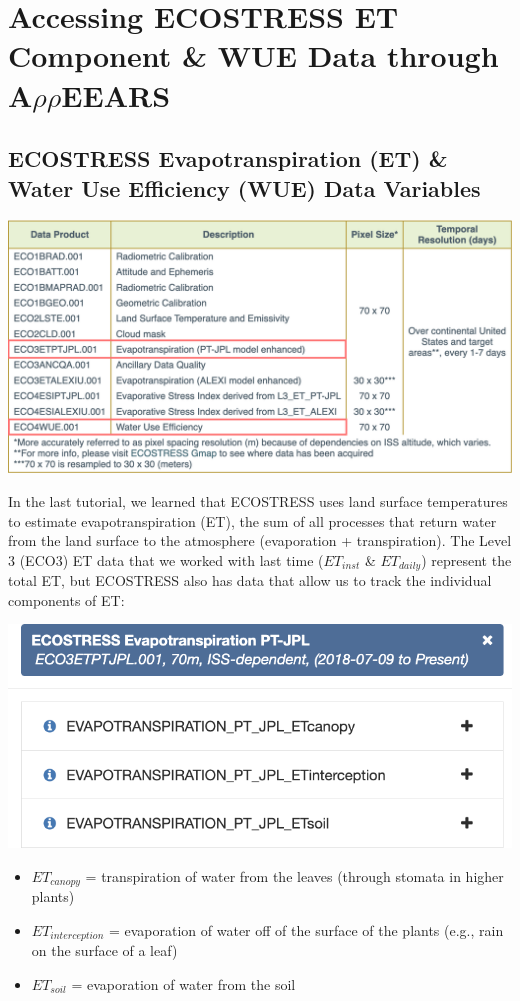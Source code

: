 \documentclass[oneside,a4paper,11pt,explicit]{book}
\begin{document}
\section{Accessing ECOSTRESS ET Component \& WUE Data through A$\rho\rho$EEARS}

\subsection{ECOSTRESS Evapotranspiration (ET) \& Water Use Efficiency (WUE) Data Variables}

\vspace{.5em}

\centerline{\includegraphics[width=.75\textwidth]{ECOSTRESS_DataProducts.png}}

\vspace{.5em}

In the last tutorial, we learned that ECOSTRESS uses land surface temperatures to estimate evapotranspiration (ET), the sum of all processes that return water from the land surface to the atmosphere (evaporation + transpiration). The Level 3 (ECO3) ET data that we worked with last time ($ET_{inst}$ \& $ET_{daily}$) represent the total ET, but ECOSTRESS also has data that allow us to track the individual components of ET:

\vspace{.5em}

\centerline{\includegraphics[width=.6\textwidth]{ETjplComponents.png}}

\begin{itemize}
	\item $ET_{canopy}$ = transpiration of water from the leaves (through stomata in higher plants)
	\item $ET_{interception}$ = evaporation of water off of the surface of the plants (e.g., rain on the surface of a leaf)
	\item $ET_{soil}$ = evaporation of water from the soil
\end{itemize}
\end{document}
